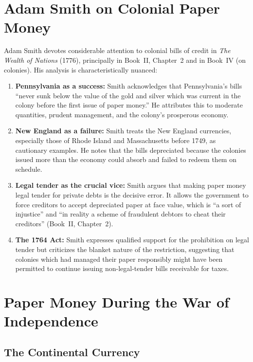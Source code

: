 \documentclass[12pt]{article}
\begin{document}
\section{Adam Smith on Colonial Paper Money}

Adam Smith devotes considerable attention to colonial bills of credit in
\emph{The Wealth of Nations} (1776), principally in Book~II, Chapter~2 and in
Book~IV (on colonies).  His analysis is characteristically nuanced:

\begin{enumerate}
    \item \textbf{Pennsylvania as a success:} Smith acknowledges that
    Pennsylvania's bills ``never sunk below the value of the gold and silver
    which was current in the colony before the first issue of paper money.''
    He attributes this to moderate quantities, prudent management, and the
    colony's prosperous economy.

    \item \textbf{New England as a failure:} Smith treats the New England
    currencies, especially those of Rhode Island and Massachusetts before 1749,
    as cautionary examples.  He notes that the bills depreciated because the
    colonies issued more than the economy could absorb and failed to redeem
    them on schedule.

    \item \textbf{Legal tender as the crucial vice:} Smith argues that making
    paper money legal tender for private debts is the decisive error.  It
    allows the government to force creditors to accept depreciated paper at
    face value, which is ``a sort of injustice'' and ``in reality a scheme of
    fraudulent debtors to cheat their creditors'' (Book~II, Chapter~2).

    \item \textbf{The 1764 Act:} Smith expresses qualified support for the
    prohibition on legal tender but criticizes the blanket nature of the
    restriction, suggesting that colonies which had managed their paper
    responsibly might have been permitted to continue issuing non-legal-tender
    bills receivable for taxes.
\end{enumerate}

\section{Paper Money During the War of Independence}

\subsection{The Continental Currency}
\end{document}
